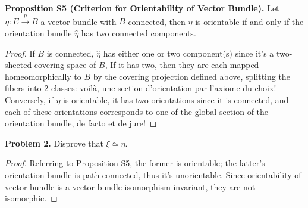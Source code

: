 \colorbox{red!30}{\textbf{Proposition S5 (Criterion for Orientability of Vector Bundle).}} Let $\eta:E\overset{p}{\to}B$ a vector bundle with $B$ connected, then $\eta$ is orientable if and only if the orientation bundle $\hat{\eta}$ has two connected components.
\begin{proof}
If $B$ is connected, $\hat{\eta}$ has either one or two component(s) since it's a two-sheeted covering space of $B$, If it has two, then they are each mapped homeomorphically to $B$ by the covering projection defined above, splitting the fibers into 2 classes: voil\`a, une section d'orientation par l'axiome du choix! Conversely, if $\eta$ is orientable, it has two orientations since it is connected, and each of these orientations corresponds to one of the global section of the orientation bundle, de facto et de jure!
\end{proof}

\colorbox{blue!30}{\textbf{Problem 2.}} Disprove that $\xi\simeq\eta$.
\begin{proof}
Referring to Proposition S5, the former is orientable; the latter's orientation bundle is path-connected, thus it's unorientable. Since orientability of vector bundle is a vector bundle isomorphism invariant, they are not isomorphic.
\end{proof}